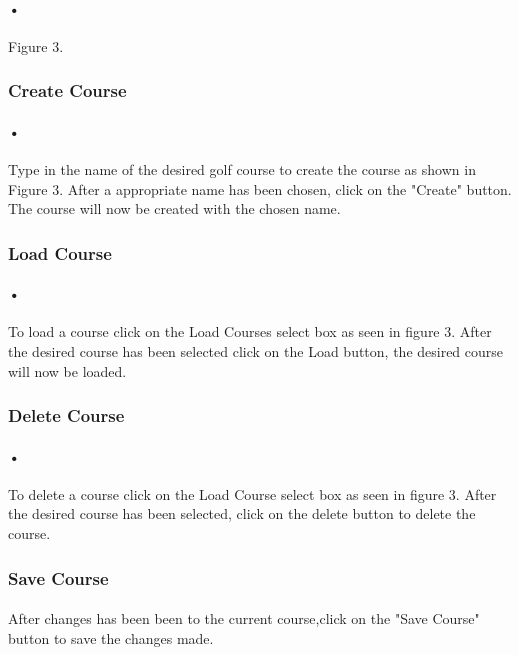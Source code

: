 \documentclass{article}
\begin{document}
    \paragraph{•}
    Figure 3.
    
    \subsubsection{Create Course}
    \paragraph{•}
    Type in the name of the desired golf course to create the course as shown in Figure 3. After a appropriate name has been chosen, click on the "Create" button. The course will now be created with the chosen name.
    
	\subsubsection{Load Course}    
	\paragraph{•}
	To load a course click on the Load Courses select box as seen in figure 3. After the desired course has been selected click on the Load button, the desired course will now be loaded.
	
	\subsubsection{Delete Course}
	\paragraph{•} 
	To delete a course click on the Load Course select box as seen in figure 3. After the desired course has been selected, click on the delete button to delete the course.
    
    
    \subsubsection{Save Course} 
    \paragraph{}
    After changes has been been to the current course,click on the "Save Course" button to save the changes made.
    
\end{document}

